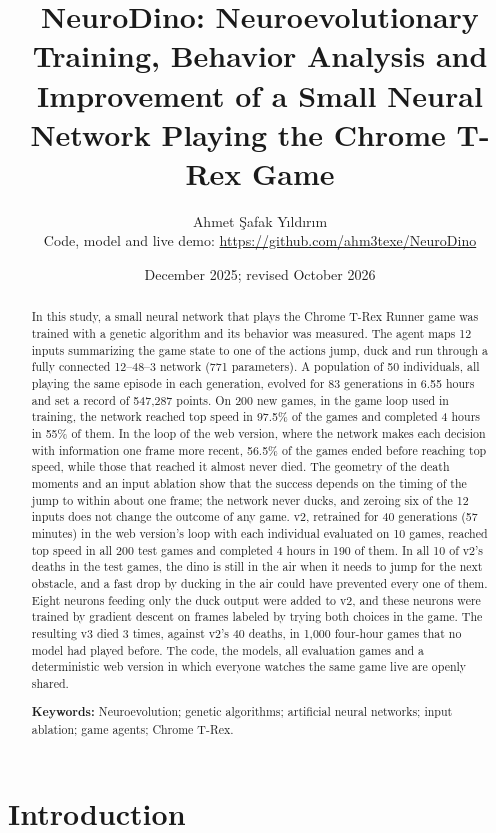 \documentclass[11pt,a4paper]{article}
\title{\textbf{NeuroDino: Neuroevolutionary Training, Behavior Analysis and Improvement of a Small Neural Network Playing the Chrome T-Rex Game}}
\author{Ahmet Şafak Yıldırım\\[0.5em]
\small Code, model and live demo: \url{https://github.com/ahm3texe/NeuroDino}}
\date{December 2025; revised October 2026}
\begin{document}
\maketitle

\begin{abstract}
In this study, a small neural network that plays the Chrome T-Rex Runner game was trained with a genetic algorithm and its behavior was measured. The agent maps 12 inputs summarizing the game state to one of the actions jump, duck and run through a fully connected 12--48--3 network (771 parameters). A population of 50 individuals, all playing the same episode in each generation, evolved for 83 generations in 6.55 hours and set a record of 547,287 points. On 200 new games, in the game loop used in training, the network reached top speed in 97.5\% of the games and completed 4 hours in 55\% of them. In the loop of the web version, where the network makes each decision with information one frame more recent, 56.5\% of the games ended before reaching top speed, while those that reached it almost never died. The geometry of the death moments and an input ablation show that the success depends on the timing of the jump to within about one frame; the network never ducks, and zeroing six of the 12 inputs does not change the outcome of any game. v2, retrained for 40 generations (57 minutes) in the web version's loop with each individual evaluated on 10 games, reached top speed in all 200 test games and completed 4 hours in 190 of them. In all 10 of v2's deaths in the test games, the dino is still in the air when it needs to jump for the next obstacle, and a fast drop by ducking in the air could have prevented every one of them. Eight neurons feeding only the duck output were added to v2, and these neurons were trained by gradient descent on frames labeled by trying both choices in the game. The resulting v3 died 3 times, against v2's 40 deaths, in 1,000 four-hour games that no model had played before. The code, the models, all evaluation games and a deterministic web version in which everyone watches the same game live are openly shared.

\textbf{Keywords:} Neuroevolution; genetic algorithms; artificial neural networks; input ablation; game agents; Chrome T-Rex.
\end{abstract}

\section{Introduction}
\end{document}
